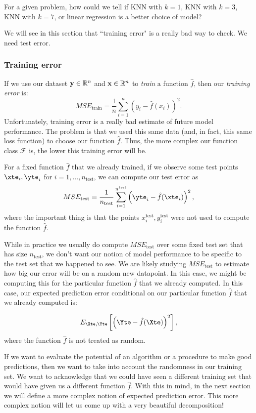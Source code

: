{For a given problem, how could we tell if KNN with $k=1$, KNN with $k=3$, KNN with $k=7$, or linear regression is a better choice of model? 

We will see in this section that ``training error" is a really bad way to check. We need test error.

\subsubsection{Training error}

If we use our dataset $\bold{y} \in \mathbb{R}^n$ and $\bold{x} \in \mathbb{R}^n$ to \emph{train} a function $\hat{f}$, then our \emph{training error} is:
$$
MSE_\mathrm{train} =  \frac{1}{n} \sum_{i=1}^n \left( y_i - \hat{f}(x_i)\right)^2. 
$$
Unfortunately, training error is a really bad estimate of future model performance. The problem is that we used this same data (and, in fact, this same loss function) to choose our function $\hat{f}$. Thus, the more complex our function class $\mathcal{F}$ is, the lower this training error will be. 








For a fixed function $\hat{f}$ that we already trained, if we observe some test points $\xte_i, \yte_i$ for $i=1,\ldots, n_\mathrm{test}$, we can compute our test error as 
$$
MSE_\mathrm{test} =  \frac{1}{n_\mathrm{test}} \sum_{i=1}^{n^{\mathrm{test}}} \left( \yte_i - \hat{f}(\xte_i)\right)^2, 
$$
where the important thing is that the points $x_i^\mathrm{test}, y_i^{\mathrm{test}}$ were not used to compute the function $\hat{f}$. 

While in practice we usually do compute $MSE_\mathrm{test}$ over some fixed test set that has size $n_\mathrm{test}$, we don't want our notion of model performance to be specific to the test set that we happened to see. We are likely studying $MSE_\mathrm{test}$ to estimate how big our error will be on a random new datapoint. In this case, we might be computing this for the particular function  $\hat{f}$ that we already computed. In this case, our expected prediction error conditional on our particular function $\hat{f}$ that we already computed is: 

$$
E_{\Xte, \Yte}\left[ \left( \Yte - \hat{f}(\Xte)\right)^2 \right],
$$
where the function $\hat{f}$ is not treated as random.

If we want to evaluate the potential of an algorithm or a procedure to make good predictions, then we want to take into account the randomness in our training set. We want to acknowledge that we could have seen a different training set that would have given us a different function $\hat{f}$. With this in mind, in the next section we will define a more complex notion of expected prediction error. This more complex notion will let us come up with a very beautiful decomposition!

}
